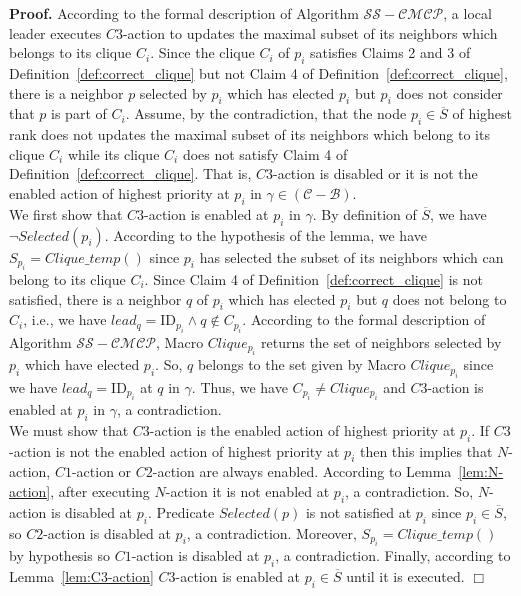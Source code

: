 \documentclass[11pt,letterpaper,onecolumn]{article}
\newenvironment{proof}{\noindent \begin{rm}{\textbf{Proof.} }}{\hspace*{\fill}$\Box$\par\end{rm} \vspace{.3cm}}
\newcommand{\id}{\mbox{ID}}
\begin{document}
\begin{proof}
According to the formal description of Algorithm $\mathcal{SS-CMCP}$, a local leader executes $C3$-action to updates the maximal subset of its neighbors which belongs to its clique $C_i$. Since the clique $C_i$ of $p_i$ satisfies Claims 2 and 3 of Definition~\ref{def:correct_clique} but not Claim 4 of Definition~\ref{def:correct_clique}, there is a neighbor $p$ selected by $p_i$ which has elected $p_i$ but $p_i$ does not consider that $p$ is part of $C_i$. Assume, by the contradiction, that the node $p_i \in \overline{S}$ of highest rank does not updates the maximal subset of its neighbors which belong to its clique $C_i$ while its clique $C_i$ does not satisfy Claim 4 of Definition~\ref{def:correct_clique}. That is, $C3$-action is disabled or it is not the enabled action of highest priority at $p_i$ in $\gamma \in (\mathcal{C}-\mathcal{B})$.\\
We first show that $C3$-action is enabled at $p_i$ in $\gamma$. By definition of $\overline{S}$, we have $\neg Selected(p_i)$. According to the hypothesis of the lemma, we have $S_{p_i}=Clique\_temp()$ since $p_i$ has selected the subset of its neighbors which can belong to its clique $C_i$. Since Claim 4 of Definition~\ref{def:correct_clique} is not satisfied, there is a neighbor $q$ of $p_i$ which has elected $p_i$ but $q$ does not belong to $C_i$, i.e., we have $lead_q=\id_{p_i} \wedge q \not \in C_{p_i}$. According to the formal description of Algorithm $\mathcal{SS-CMCP}$, Macro $Clique_{p_i}$ returns the set of neighbors selected by $p_i$ which have elected $p_i$. So, $q$ belongs to the set given by Macro $Clique_{p_i}$ since we have $lead_q=\id_{p_i}$ at $q$ in $\gamma$. Thus, we have $C_{p_i} \neq Clique_{p_i}$ and $C3$-action is enabled at $p_i$ in $\gamma$, a contradiction.\\
We must show that $C3$-action is the enabled action of highest priority at $p_i$. If $C3$-action is not the enabled action of highest priority at $p_i$ then this implies that $N$-action, $C1$-action or $C2$-action are always enabled. According to Lemma~\ref{lem:N-action}, after executing $N$-action it is not enabled at $p_i$, a contradiction. So, $N$-action is disabled at $p_i$. Predicate $Selected(p)$ is not satisfied at $p_i$ since $p_i \in \overline{S}$, so $C2$-action is disabled at $p_i$, a contradiction. Moreover, $S_{p_i}=Clique\_temp()$ by hypothesis so $C1$-action is disabled at $p_i$, a contradiction. Finally, according to Lemma~\ref{lem:C3-action} $C3$-action is enabled at $p_i \in \overline{S}$ until it is executed.
\end{proof}
\end{document}
